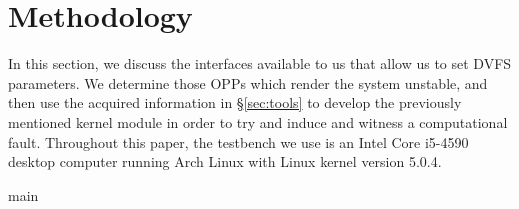 \chapter{Methodology}

In this section, we discuss the interfaces available to us that allow us to set
DVFS parameters. We determine those OPPs which render the system unstable, and
then use the acquired information in §\ref{sec:tools} to develop the previously
mentioned kernel module in order to try and induce and witness a computational
fault. Throughout this paper, the testbench we use is an Intel Core i5-4590
desktop computer running Arch Linux with Linux kernel version 5.0.4.

{main}




